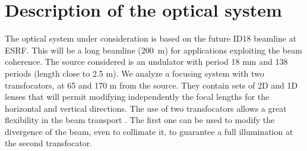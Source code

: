 \documentclass{iucr}              %
\begin{document}

\section{Description of the optical system}
\label{sec:beamline}

The optical system under consideration is based on the future ID18 beamline at ESRF. This will be a long beamline (200~m) for applications exploiting the beam coherence. The source considered is an undulator with period 18 mm and 138 periods (length close to 2.5 m).  
We analyze a focusing system with two transfocators, at 65 and 170 m from the source. They contain sets of 2D and 1D lenses that will permit modifying independently the focal lengths for the horizontal and vertical directions. The use of two transfocators allows a great flexibility in the beam transport \cite{Vaughan:kv5084}. The first one can be used to modify the divergence of the beam, even to collimate it, to guarantee a full illumination at the second transfocator.  
\end{document}
